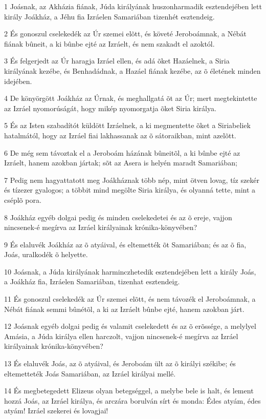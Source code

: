 \par 1 Joásnak, az Akházia fiának, Júda királyának huszonharmadik esztendejében lett király Joákház, a Jéhu fia Izráelen Samariában tizenhét esztendeig.
\par 2 És gonoszul cselekedék az Úr szemei elõtt, és követé Jeroboámnak, a Nébát fiának bûneit, a ki bûnbe ejté az Izráelt, és nem szakadt el azoktól.
\par 3 És felgerjedt az Úr haragja Izráel ellen, és adá õket Hazáelnek, a Siria királyának kezébe, és Benhadádnak, a Hazáel fiának kezébe, az õ életének minden idejében.
\par 4 De könyörgött Joákház az Úrnak, és meghallgatá õt az Úr; mert megtekintette az Izráel nyomorúságát, hogy mikép nyomorgatja õket Siria királya.
\par 5 És az Isten szabadítót küldött Izráelnek, a ki megmentette õket a Siriabeliek hatalmától, hogy az Izráel fiai lakhassanak az õ sátoraikban, mint azelõtt.
\par 6 De még sem távoztak el a Jeroboám házának bûneitõl, a ki bûnbe ejté az Izráelt, hanem azokban jártak; sõt az Asera is helyén maradt Samariában;
\par 7 Pedig nem hagyattatott meg Joákháznak több nép, mint ötven lovag, tíz szekér és tízezer gyalogos; a többit mind megölte Siria királya, és olyanná tette, mint a cséplõ pora.
\par 8 Joákház egyéb dolgai pedig és minden cselekedetei és az õ ereje, vajjon nincsenek-é megírva az Izráel királyainak krónika-könyvében?
\par 9 És elaluvék Joákház az õ atyáival, és eltemették õt Samariában; és az õ fia, Joás, uralkodék õ helyette.
\par 10 Joásnak, a Júda királyának harminczhetedik esztendejében lett a király Joás, a Joákház fia, Izráelen Samariában, tizenhat esztendeig.
\par 11 És gonoszul cselekedék az Úr szemei elõtt, és nem távozék el Jeroboámnak, a Nébát fiának semmi bûnétõl, a ki az Izráelt bûnbe ejté, hanem azokban járt.
\par 12 Joásnak egyéb dolgai pedig és valamit cselekedett és az õ erõssége, a melylyel Amásia, a Júda királya ellen harczolt, vajjon nincsenek-é megírva az Izráel királyainak krónika-könyvében?
\par 13 És elaluvék Joás, az õ atyáival, és Jeroboám ült az õ királyi székibe; és eltemetteték Joás Samariában, az Izráel királyai mellé.
\par 14 És megbetegedett Elizeus olyan betegséggel, a melybe bele is halt, és lement hozzá Joás, az Izráel királya, és arczára borulván sírt és monda: Édes atyám, édes atyám! Izráel szekerei és lovagjai!
